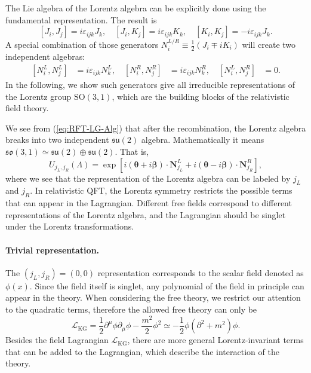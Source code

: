\documentclass[aps,prb,superscriptaddress,nofootinbib]{revtex4}
\begin{document}
The Lie algebra of the Lorentz algebra can be explicitly done using the fundamental representation. 
The result is
\begin{equation}
	\left[J_i, J_j\right] = i \varepsilon_{ijk} J_k, \quad
	\left[J_i, K_j\right] = i \varepsilon_{ijk} K_k, \quad
	\left[K_i, K_j\right] = -i\varepsilon_{ijk} J_k.
\end{equation}
A special combination of those generators $N_i^{L/R} \equiv \frac{1}{2}(J_i \mp i K_i)$ will create two independent algebras:
\begin{equation}\label{eq:RFT-LG-Alg}
\begin{aligned}
	\left[N_i^L, N_j^L \right] &= i\varepsilon_{ijk}N_k^L, \quad
	\left[N_i^R, N_j^R \right] &= i\varepsilon_{ijk}N_k^R, \quad
	\left[N_i^L, N_j^R \right] &= 0.
\end{aligned}
\end{equation}
In the following, we show such generators give all irreducible representations of the Lorentz group $\mathrm{SO}(3,1)$, which are the building blocks of the relativistic field theory.




We see from (\ref{eq:RFT-LG-Alg}) that after the recombination, the Lorentz algebra breaks into two independent $\mathfrak{su}(2)$ algebra.
Mathematically it means $\mathfrak{so}(3,1) \simeq \mathfrak{su}(2) \oplus \mathfrak{su}(2)$.
That is,
\begin{equation}
	U_{j_L,j_R}(\Lambda)
	= \exp\left[i(\bm\theta+i\bm\beta)\cdot \bm N^L_{j_L} + i(\bm\theta-i\bm\beta)\cdot \bm N^R_{j_R}\right],
\end{equation}
where we see that the representation of the Lorentz algebra can be labeled by $j_L$ and $ j_R$.
In relativistic QFT, the Lorentz symmetry restricts the possible terms that can appear in the Lagrangian.
Different free fields correspond to different representations of the Lorentz algebra, and the Lagrangian should be singlet under the Lorentz transformations.


\paragraph*{Trivial representation.}
The $(j_L,j_R) = (0,0)$ representation corresponds to the scalar field denoted as $\phi(x)$.
Since the field itself is singlet, any polynomial of the field in principle can appear in the theory.
When considering the free theory, we restrict our attention to the quadratic terms, therefore the allowed free theory can only be
\begin{equation*}
	\mathcal L_{\mathrm{KG}} = \frac{1}{2}\partial^\mu \phi \partial_\mu \phi -\frac{m^2}{2}\phi^2 
	\simeq -\frac{1}{2}\phi (\partial^2+m^2) \phi.
\end{equation*}
Besides the field Lagrangian $\mathcal L_{\mathrm{KG}}$, there are more general Lorentz-invariant terms that can be added to the Lagrangian, which describe the interaction of the theory.
\end{document}
